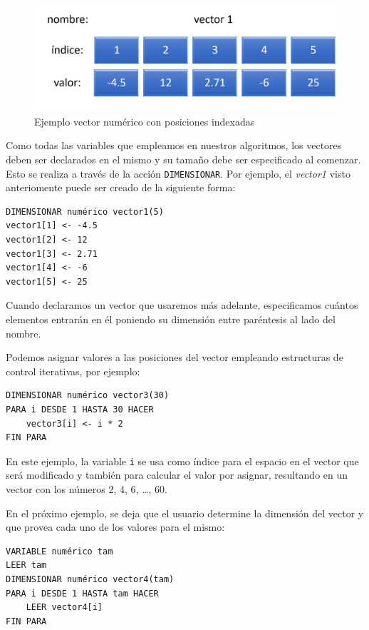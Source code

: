 \documentclass[]{book}
\begin{document}
\begin{figure}

{\centering \includegraphics[width=0.8\linewidth]{images/12_vector1} 

}

\caption{Ejemplo vector numérico con posiciones indexadas}\label{fig:vector1bis}
\end{figure}

Como todas las variables que empleamos en nuestros algoritmos, los vectores deben ser declarados en el mismo y su tamaño debe ser especificado al comenzar. Esto se realiza a través de la acción \texttt{DIMENSIONAR}. Por ejemplo, el \emph{vector1} visto anteriomente puede ser creado de la siguiente forma:

\begin{verbatim}
DIMENSIONAR numérico vector1(5)
vector1[1] <- -4.5
vector1[2] <- 12
vector1[3] <- 2.71
vector1[4] <- -6
vector1[5] <- 25
\end{verbatim}

Cuando declaramos un vector que usaremos más adelante, especificamos cuántos elementos entrarán en él poniendo su dimensión entre paréntesis al lado del nombre.

Podemos asignar valores a las posiciones del vector empleando estructuras de control iterativas, por ejemplo:

\begin{verbatim}
DIMENSIONAR numérico vector3(30)
PARA i DESDE 1 HASTA 30 HACER
    vector3[i] <- i * 2
FIN PARA
\end{verbatim}

En este ejemplo, la variable \texttt{i} se usa como índice para el espacio en el vector que será modificado y también para calcular el valor por asignar, resultando en un vector con los números 2, 4, 6, \ldots{}, 60.

En el próximo ejemplo, se deja que el usuario determine la dimensión del vector y que provea cada uno de los valores para el mismo:

\begin{verbatim}
VARIABLE numérico tam
LEER tam
DIMENSIONAR numérico vector4(tam)
PARA i DESDE 1 HASTA tam HACER
    LEER vector4[i]
FIN PARA
\end{verbatim}
\end{document}
